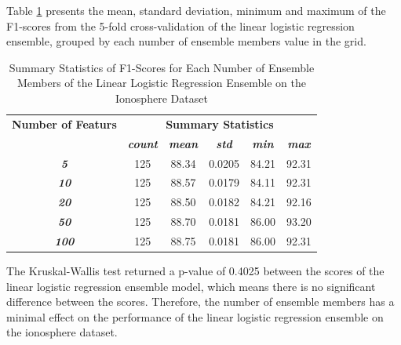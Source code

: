 \documentclass[10pt, conference]{IEEEtran}
\begin{document}
Table \ref{table: I_member_linear_performance_metrics} presents the mean, standard deviation, minimum and maximum of the
F1-scores from the 5-fold cross-validation of the linear logistic regression ensemble, grouped by each number of ensemble members
value in the grid.
\begin{table}[H]
    \caption{Summary Statistics of F1-Scores for Each Number of Ensemble Members of the Linear Logistic Regression Ensemble on the Ionosphere Dataset}
    \begin{center}
        \begin{tabular}{|c||c|c|c|c|c|}
            \hline
            \textbf{Number of Featurs}&\multicolumn{5}{|c|}{\textbf{Summary Statistics}} \\
            \cline{2-6}
                       &\textbf{\textit{count}} & \textbf{\textit{mean}} & \textbf{\textit{std}} & \textbf{\textit{min}} & \textbf{\textit{max}}\\
            \hline
            \textbf{\textit{5}}   & 125 & 88.34 & 0.0205 & 84.21 & 92.31 \\
            \textbf{\textit{10}}  & 125 & 88.57 & 0.0179 & 84.11 & 92.31 \\
            \textbf{\textit{20}}  & 125 & 88.50 & 0.0182 & 84.21 & 92.16 \\
            \textbf{\textit{50}}  & 125 & 88.70 & 0.0181 & 86.00 & 93.20 \\
            \textbf{\textit{100}} & 125 & 88.75 & 0.0181 & 86.00 & 92.31 \\
            \hline
        \end{tabular}
    \end{center}
    \label{table: I_member_linear_performance_metrics}
\end{table}
The Kruskal-Wallis test returned a p-value of 0.4025 between the scores of the linear logistic regression ensemble model,
which means there is no significant difference between the scores. Therefore, the number of ensemble members
has a minimal effect on the performance of the linear logistic regression ensemble on the ionosphere dataset.
\end{document}
